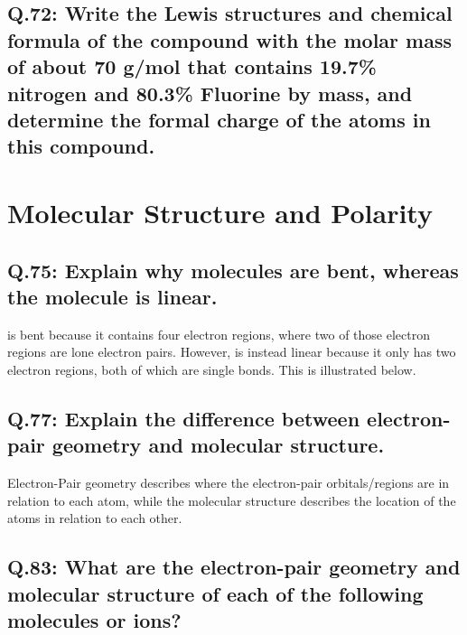 \documentclass[11pt, letterpaper]{article}
\begin{document}
\subsection*{Q.72: Write the Lewis structures and chemical formula of the compound with the molar
mass of about 70 g/mol that contains 19.7\% nitrogen and 80.3\% Fluorine by mass, and determine
the formal charge of the atoms in this compound.}

\begin{center}
\end{center}


\section{Molecular Structure and Polarity}

\subsection*{Q.75: Explain why  molecules are bent, whereas the 
molecule is linear.}

 is bent because it contains four electron regions, where two of those electron regions
are lone electron pairs.
However,  is instead linear because it only has two electron regions,
both of which are single bonds.
This is illustrated below.
\begin{center}
	\qquad \qquad \qquad
\end{center}

\subsection*{Q.77: Explain the difference between electron-pair geometry and molecular structure.}

Electron-Pair geometry describes where the electron-pair orbitals/regions are in relation to
each atom, while the molecular structure describes the location of the atoms in relation to
each other.

\subsection*{Q.83: What are the electron-pair geometry and molecular structure of each of the
following molecules or ions?}
\end{document}
